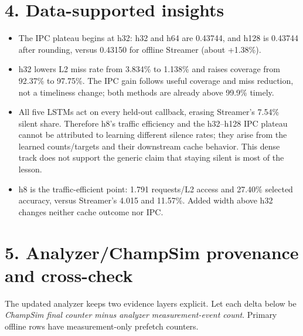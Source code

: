 \documentclass[10pt]{article}
\begin{document}
\section*{4. Data-supported insights}
\begin{infobox}[fontupper=\small]
\begin{itemize}[itemsep=1pt,topsep=1pt]
\item The IPC plateau begins at h32: h32 and h64 are 0.43744, and h128 is 0.43744 after rounding, versus 0.43150 for offline Streamer (about +1.38\%).
\item h32 lowers L2 miss rate from 3.834\% to 1.138\% and raises coverage from 92.37\% to 97.75\%.  The IPC gain follows useful coverage and miss reduction, not a timeliness change; both methods are already above 99.9\% timely.
\item All five LSTMs act on every held-out callback, erasing Streamer's 7.54\%
silent share.  Therefore h8's traffic efficiency and the h32--h128 IPC plateau
cannot be attributed to learning different silence rates; they arise from the
learned counts/targets and their downstream cache behavior.  This dense track
does not support the generic claim that staying silent is most of the lesson.
\item h8 is the traffic-efficient point: 1.791 requests/L2 access and 27.40\% selected accuracy, versus Streamer's 4.015 and 11.57\%.  Added width above h32 changes neither cache outcome nor IPC.
\end{itemize}
\end{infobox}

\clearpage
\section*{5. Analyzer/ChampSim provenance and cross-check}
The updated analyzer keeps two evidence layers explicit.  Let each delta below
be \emph{ChampSim final counter minus analyzer measurement-event count}.
Primary offline rows have measurement-only prefetch counters.

\begin{center}\scriptsize
{}
\end{center}
\end{document}
